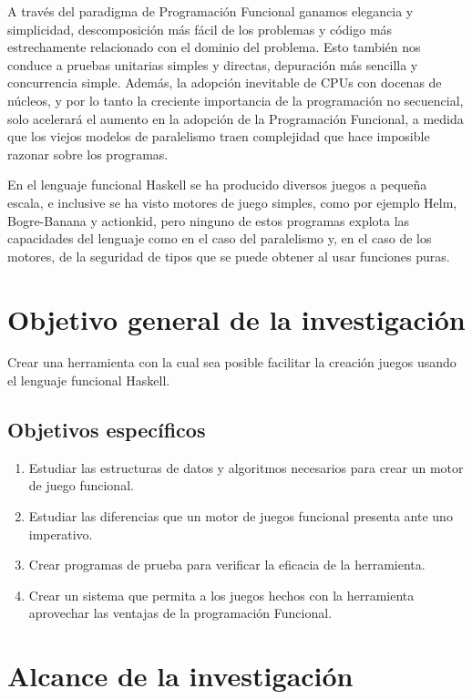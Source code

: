 A través del paradigma de Programación Funcional ganamos elegancia y simplicidad, descomposición más fácil de los problemas y código más estrechamente relacionado con el dominio del problema. Esto también nos conduce a pruebas unitarias simples y directas, depuración más sencilla y concurrencia simple. Además, la adopción inevitable de CPUs con docenas de núcleos, y por lo tanto la creciente importancia de la programación no secuencial, solo acelerará el aumento en la adopción de la Programación Funcional, a medida que los viejos modelos de paralelismo traen complejidad que hace imposible razonar sobre los programas.

En el lenguaje funcional Haskell se ha producido diversos juegos a pequeña escala, e inclusive se ha visto motores de juego simples, como por ejemplo Helm, Bogre-Banana y actionkid, pero ninguno de estos programas explota las capacidades del lenguaje como en el caso del paralelismo y, en el caso de los motores, de la seguridad de tipos que se puede obtener al usar funciones puras.

\section{Objetivo general de la investigación}

Crear una herramienta con la cual sea posible facilitar la creación juegos usando el lenguaje funcional Haskell.

\subsection{Objetivos específicos}

\begin{enumerate}
  \item Estudiar las estructuras de datos y algoritmos necesarios para crear un motor de juego funcional.
  \item Estudiar las diferencias que un motor de juegos funcional presenta ante uno imperativo.
  \item Crear programas de prueba para verificar la eficacia de la herramienta.
  \item Crear un sistema que permita a los juegos hechos con la herramienta aprovechar las ventajas de la programación Funcional.
\end{enumerate}

\section{Alcance de la investigación}

